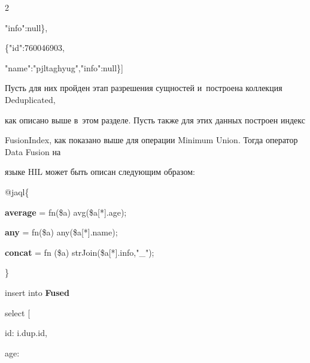 \begin{multicols}{2}
{"info":null\},



\noindent

  \{"id":760046903,

"name":"pjltaghyug","info":null\}]



}



  Пусть для них пройден этап разрешения сущностей и~построена коллекция Deduplicated,

как описано выше в~этом разделе. Пусть также для этих данных построен индекс

FusionIndex, как показано выше для операции Minimum Union. Тогда оператор Data Fusion на

языке HIL может быть описан следующим образом:



{\sf

\noindent

  @jaql\{



\noindent

  {\textbf{average}} = fn(\$a) avg(\$a[*].age);



\noindent

  {\textbf{any}} = fn(\$a) any(\$a[*].name);



\noindent

  {\textbf{concat}} = fn (\$a) strJoin(\$a[*].info,"\_");



\noindent

  \}





  \vspace*{3pt}



\noindent

insert into {\textbf{Fused}}



\noindent

select [



\noindent

id: i.dup.id,



\noindent

age:



\noindent

}
\end{multicols}
